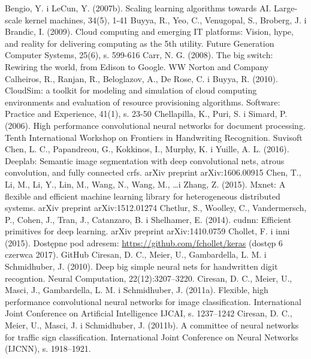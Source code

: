 \documentclass[12pt,a4paper,twoside]{article}
\begin{document}
\begin{thebibliography}{99}
 Bengio, Y. i LeCun, Y. (2007b). Scaling learning algorithms towards AI. Large-scale kernel machines, 34(5), 1-41
 Buyya, R., Yeo, C., Venugopal, S., Broberg, J. i Brandic, I. (2009). Cloud computing and emerging IT platforms: Vision, hype, and reality for delivering computing as the 5th utility. Future Generation Computer Systems, 25(6), s. 599-616
 Carr, N. G. (2008). The big switch: Rewiring the world, from Edison to Google. WW Norton and Company
 Calheiros, R., Ranjan, R., Beloglazov, A., De Rose, C. i Buyya, R. (2010). CloudSim: a toolkit for modeling and simulation of cloud computing environments and evaluation of resource provisioning algorithms. Software: Practice and Experience, 41(1), s. 23-50
 Chellapilla, K., Puri, S. i Simard, P. (2006). High performance convolutional neural networks for document processing. Tenth International Workshop on Frontiers in Handwriting Recognition. Suvisoft
 Chen, L. C., Papandreou, G., Kokkinos, I., Murphy, K. i Yuille, A. L. (2016). Deeplab: Semantic image segmentation with deep convolutional nets, atrous convolution, and fully connected crfs. arXiv preprint arXiv:1606.00915
 Chen, T., Li, M., Li, Y., Lin, M., Wang, N., Wang, M., \ldots i Zhang, Z. (2015). Mxnet: A flexible and efficient machine learning library for heterogeneous distributed systems. arXiv preprint arXiv:1512.01274
 Chetlur, S., Woolley, C., Vandermersch, P., Cohen, J., Tran, J., Catanzaro, B. i Shelhamer, E. (2014). cudnn: Efficient primitives for deep learning. arXiv preprint arXiv:1410.0759
 Chollet, F. i inni (2015). Dostępne pod adresem: \url{https://github.com/fchollet/keras} (dostęp 6 czerwca 2017). GitHub
 Ciresan, D. C., Meier, U., Gambardella, L. M. i Schmidhuber, J. (2010). Deep big simple neural nets for handwritten digit recogntion. Neural Computation, 22(12):3207–3220.
 Ciresan, D. C., Meier, U., Masci, J., Gambardella, L. M. i Schmidhuber, J. (2011a). Flexible, high performance convolutional neural networks for image classification. International Joint Conference on Artificial Intelligence IJCAI, s. 1237–1242
 Ciresan, D. C., Meier, U., Masci, J. i Schmidhuber, J. (2011b). A committee of neural networks for traffic sign classification. International Joint Conference on Neural Networks (IJCNN), s. 1918–1921.

\end{thebibliography}
\end{document}

